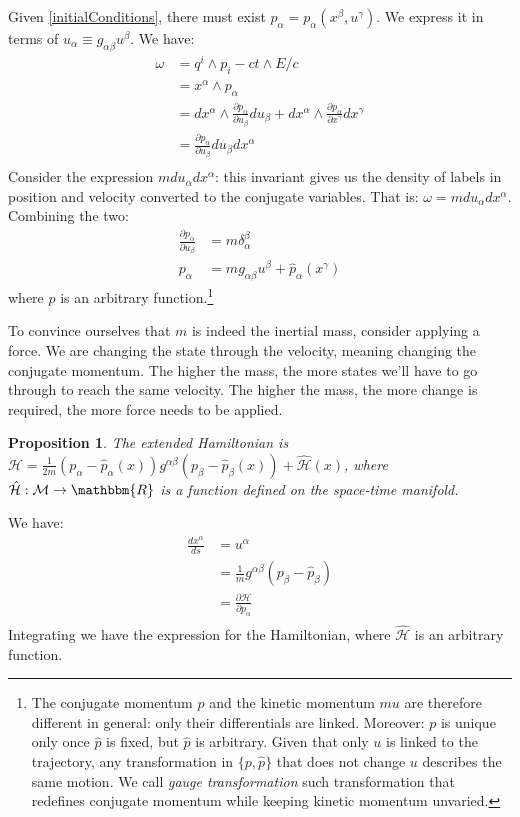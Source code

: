 \documentclass[aps,pra,10pt,twocolumn,floatfix,nofootinbib]{revtex4-1}
\newtheorem{prop}[thm]{Proposition}
\theoremstyle{definition}
\begin{document}
Given \ref{initialConditions}, there must exist $p_\alpha=p_\alpha(x^\beta , u^\gamma)$. We express it in terms of $u_\alpha\equiv g_{\alpha \beta} u^\beta$. We have:
\begin{align*}
\omega &= q^i\wedge p_i - ct \wedge E/c \\
&=x^\alpha \wedge p_\alpha \\
&=dx^\alpha \wedge \frac{\partial p_\alpha}{\partial u_\beta}du_\beta + dx^\alpha \wedge \frac{\partial p_\alpha}{\partial x^\gamma}dx^\gamma \\
&=\frac{\partial p_\alpha}{\partial u_\beta}du_\beta dx^\alpha \\
\end{align*}
Consider the expression $m du_\alpha dx^\alpha$: this invariant gives us the density of labels in position and velocity converted to the conjugate variables. That is: $\omega=m du_\alpha dx^\alpha$. Combining the two:
\begin{align*}
\frac{\partial p_\alpha}{\partial u_\beta} &= m \delta^\beta_\alpha \\
p_\alpha &= m g_{\alpha \beta}u^\beta + \hat{p}_\alpha(x^\gamma)
\end{align*}
where $\hat{p}$ is an arbitrary function.\footnote{The conjugate momentum $p$ and the kinetic momentum $mu$ are therefore different in general: only their differentials are linked. Moreover: $p$ is unique only once $\hat{p}$ is fixed, but $\hat{p}$ is arbitrary. Given that only $u$ is linked to the trajectory, any transformation in $\{p, \hat{p} \}$ that does not change $u$ describes the same motion. We call \emph{gauge transformation} such transformation that redefines conjugate momentum while keeping kinetic momentum unvaried.}

To convince ourselves that $m$ is indeed the inertial mass, consider applying a force. We are changing the state through the velocity, meaning changing the conjugate momentum. The higher the mass, the more states we'll have to go through to reach the same velocity. The higher the mass, the more change is required, the more force needs to be applied.

\begin{prop}\label{kineticHamiltonian}
The extended Hamiltonian is $\mathcal{H}=\frac{1}{2m}(p_\alpha-\hat{p}_\alpha(x))g^{\alpha\beta}(p_\beta-\hat{p}_\beta(x))+\hat{\mathcal{H}}(x)$, where $\hat{\mathcal{H}} : \mathcal{M} \rightarrow \mathbbm{R}$ is a function defined on the space-time manifold.
\end{prop}
We have:
\begin{align*}
\frac{dx^\alpha}{ds} &= u^\alpha \\
&= \frac{1}{m}g^{\alpha\beta}(p_\beta-\hat{p}_\beta) \\
&= \frac{\partial \mathcal{H}}{\partial p_\alpha} \\
\end{align*}
Integrating we have the expression for the Hamiltonian, where $\hat{\mathcal{H}}$ is an arbitrary function.
\end{document}
